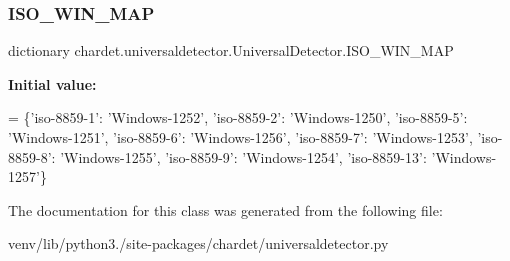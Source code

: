 \subsubsection{\texorpdfstring{I\+S\+O\+\_\+\+W\+I\+N\+\_\+\+M\+AP}{ISO\_WIN\_MAP}}
{\footnotesize\ttfamily dictionary chardet.\+universaldetector.\+Universal\+Detector.\+I\+S\+O\+\_\+\+W\+I\+N\+\_\+\+M\+AP\hspace{0.3cm}{\ttfamily [static]}}

{\bfseries Initial value\+:}
\begin{DoxyCode}
=  \{\textcolor{stringliteral}{'iso-8859-1'}: \textcolor{stringliteral}{'Windows-1252'},
                   \textcolor{stringliteral}{'iso-8859-2'}: \textcolor{stringliteral}{'Windows-1250'},
                   \textcolor{stringliteral}{'iso-8859-5'}: \textcolor{stringliteral}{'Windows-1251'},
                   \textcolor{stringliteral}{'iso-8859-6'}: \textcolor{stringliteral}{'Windows-1256'},
                   \textcolor{stringliteral}{'iso-8859-7'}: \textcolor{stringliteral}{'Windows-1253'},
                   \textcolor{stringliteral}{'iso-8859-8'}: \textcolor{stringliteral}{'Windows-1255'},
                   \textcolor{stringliteral}{'iso-8859-9'}: \textcolor{stringliteral}{'Windows-1254'},
                   \textcolor{stringliteral}{'iso-8859-13'}: \textcolor{stringliteral}{'Windows-1257'}\}
\end{DoxyCode}


The documentation for this class was generated from the following file\+:\begin{DoxyCompactItemize}
\item 
venv/lib/python3./site-\/packages/chardet/universaldetector.\+py\end{DoxyCompactItemize}
